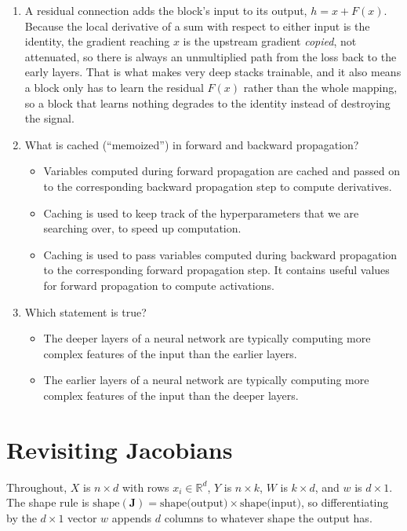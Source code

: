 \documentclass[11pt]{article}
\begin{document}
\begin{enumerate}
  \item A residual connection adds the block's input to its output, $h = x + F(x)$. Because the local
        derivative of a sum with respect to either input is the identity, the gradient reaching $x$ is the
        upstream gradient \emph{copied}, not attenuated, so there is always an unmultiplied path from the
        loss back to the early layers. That is what makes very deep stacks trainable, and it also means a
        block only has to learn the residual $F(x)$ rather than the whole mapping, so a block that learns
        nothing degrades to the identity instead of destroying the signal.

  \item What is cached (``memoized'') in forward and backward propagation?
        \begin{itemize}
          \item[{[X]}] Variables computed during forward propagation are cached and passed on to the
                corresponding backward propagation step to compute derivatives.
          \item[{[\ ]}] Caching is used to keep track of the hyperparameters that we are searching over, to
                speed up computation.
          \item[{[\ ]}] Caching is used to pass variables computed during backward propagation to the
                corresponding forward propagation step. It contains useful values for forward propagation
                to compute activations.
        \end{itemize}

  \item Which statement is true?
        \begin{itemize}
          \item[{[X]}] The deeper layers of a neural network are typically computing more complex features
                of the input than the earlier layers.
          \item[{[\ ]}] The earlier layers of a neural network are typically computing more complex
                features of the input than the deeper layers.
        \end{itemize}
\end{enumerate}

\section{Revisiting Jacobians}

Throughout, $X$ is $n \times d$ with rows $x_i \in \mathbb{R}^{d}$, $Y$ is $n \times k$, $W$ is
$k \times d$, and $w$ is $d \times 1$. The shape rule is
$\text{shape}(\mathbf{J}) = \text{shape(output)} \times \text{shape(input)}$, so differentiating by the
$d \times 1$ vector $w$ appends $d$ columns to whatever shape the output has.
\end{document}

